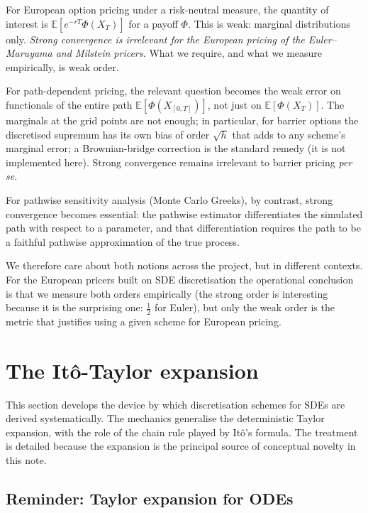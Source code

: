 \documentclass[11pt,a4paper]{article}
\theoremstyle{plain}
\theoremstyle{definition}
\theoremstyle{remark}
\newcommand{\E}{\mathbb{E}}
\begin{document}
For European option pricing under a risk-neutral measure, the quantity
of interest is $\E[e^{-rT} \Phi(X_T)]$ for a payoff $\Phi$. This is
weak: marginal distributions only. \emph{Strong convergence is
irrelevant for the European pricing of the Euler--Maruyama and Milstein
pricers.} What we require, and what we measure empirically, is weak order.

For path-dependent pricing, the relevant question becomes
the weak error on functionals of the entire path
$\E[\Phi(X_{[0,T]})]$, not just on $\E[\Phi(X_T)]$. The marginals at
the grid points are not enough; in particular, for barrier options the
discretised supremum has its own bias of order $\sqrt{h}$ that adds to
any scheme's marginal error; a Brownian-bridge correction is the
standard remedy (it is not implemented here). Strong convergence remains irrelevant to barrier pricing
\emph{per se}.

For pathwise sensitivity analysis (Monte Carlo Greeks), by contrast, strong
convergence becomes essential: the pathwise estimator differentiates
the simulated path with respect to a parameter, and that
differentiation requires the path to be a faithful pathwise
approximation of the true process.

We therefore care about both notions across the project, but in
different contexts. For the European pricers built on SDE discretisation
the operational
conclusion is that we measure both orders empirically (the strong
order is interesting because it is the surprising one: $\tfrac{1}{2}$
for Euler), but only the weak order is the metric that justifies
using a given scheme for European pricing.

\section{The It\^o-Taylor expansion}
\label{sec:ito-taylor}

This section develops the device by which discretisation schemes for
SDEs are derived systematically. The mechanics generalise the
deterministic Taylor expansion, with the role of the chain rule
played by It\^o's formula. The treatment is detailed because the
expansion is the principal source of conceptual novelty in this note.

\subsection{Reminder: Taylor expansion for ODEs}
\end{document}
